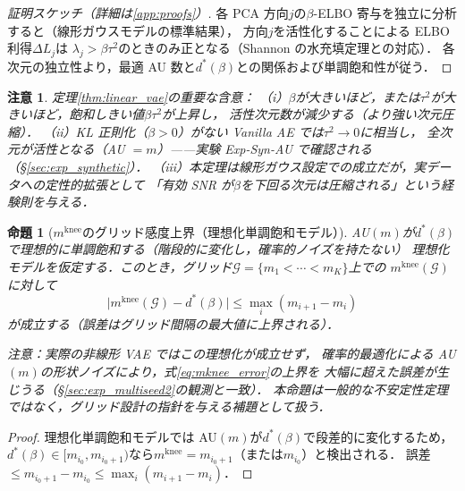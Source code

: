 \documentclass[11pt,a4paper]{jsarticle}
\newtheorem{proposition}{命題}
\newtheorem{remark}{注意}
\newcommand{\mknee}{m^{\mathrm{knee}}}
\begin{document}
\begin{proof}[証明スケッチ（詳細は\ref{app:proofs}）]
各 PCA 方向$j$の$\beta$-ELBO 寄与を独立に分析すると（線形ガウスモデルの標準結果），
方向$j$を活性化することによる ELBO 利得$\Delta L_j$は
$\lambda_j > \beta\tau^2$のときのみ正となる（Shannon の水充填定理との対応）．
各次元の独立性より，最適 AU 数と$d^*(\beta)$との関係および単調飽和性が従う．
\end{proof}

\begin{remark}
定理\ref{thm:linear_vae}の重要な含意：
（i）$\beta$が大きいほど，または$\tau^2$が大きいほど，飽和しきい値$\beta\tau^2$が上昇し，
活性次元数が減少する（より強い次元圧縮）．
（ii）KL 正則化（$\beta > 0$）がない Vanilla AE では$\tau^2 \to 0$に相当し，
全次元が活性となる（AU $= m$）——実験 Exp-Syn-AU で確認される（§\ref{sec:exp_synthetic}）．
（iii）本定理は線形ガウス設定での成立だが，実データへの定性的拡張として
「有効 SNR が$\beta$を下回る次元は圧縮される」という経験則を与える．
\end{remark}

\begin{proposition}[$\mknee$のグリッド感度上界（理想化単調飽和モデル）]\label{thm:mknee_instab}
AU$(m)$が$d^*(\beta)$で理想的に単調飽和する（階段的に変化し，確率的ノイズを持たない）
理想化モデルを仮定する．このとき，グリッド$\mathcal{G} = \{m_1 < \cdots < m_K\}$上での
$\mknee(\mathcal{G})$に対して
\begin{equation}
  \bigl|\mknee(\mathcal{G}) - d^*(\beta)\bigr|
  \leq \max_{i} (m_{i+1} - m_i)
  \label{eq:mknee_error}
\end{equation}
が成立する（誤差はグリッド間隔の最大値に上界される）．

\noindent\textit{注意：実際の非線形 VAE ではこの理想化が成立せず，
確率的最適化による AU$(m)$の形状ノイズにより，式\eqref{eq:mknee_error}の上界を
大幅に超えた誤差が生じうる（§\ref{sec:exp_multiseed2}の観測と一致）．
本命題は一般的な不安定性定理ではなく，グリッド設計の指針を与える補題として扱う．}
\end{proposition}

\begin{proof}
理想化単調飽和モデルでは AU$(m)$が$d^*(\beta)$で段差的に変化するため，
$d^*(\beta) \in [m_{i_0}, m_{i_0+1})$なら$\mknee = m_{i_0+1}$（または$m_{i_0}$）と検出される．
誤差$\leq m_{i_0+1} - m_{i_0} \leq \max_i(m_{i+1}-m_i)$．
\end{proof}
\end{document}
